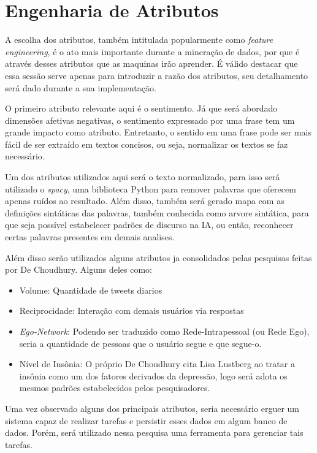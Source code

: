\section{Engenharia de Atributos}
A escolha dos atributos, também intitulada popularmente como \textit{feature engineering}, é o ato mais importante durante a mineração de dados, por que é através desses atributos que as maquinas irão aprender. É válido destacar que essa sessão serve apenas para introduzir a razão dos atributos, seu detalhamento será dado durante a sua implementação.

O primeiro atributo relevante aqui é o sentimento. Já que será abordado dimensões afetivas negativas, o sentimento expressado por uma frase tem um grande impacto como atributo. Entretanto, o sentido em uma frase pode ser mais fácil de ser extraído em textos concisos, ou seja, normalizar os textos se faz necessário.

Um dos atributos utilizados aqui será o texto normalizado, para isso será utilizado o \textit{spacy}, uma biblioteca Python para remover palavras que oferecem apenas ruídos ao resultado. Além disso, também será gerado mapa com as definições sintáticas das palavras, também conhecida como arvore sintática, para que seja possível estabelecer padrões de discurso na IA, ou então, reconhecer certas palavras presentes em demais analises.

Além disso serão utilizados alguns atributos ja consolidados pelas pesquisas feitas por De Choudhury\cite{de2013social, de2013predicting}. Alguns deles como:
\begin{itemize}
 \item Volume: Quantidade de tweets diarios
 \item Reciprocidade: Interação com demais usuários via respostas
 \item \textit{Ego-Network}: Podendo ser traduzido como Rede-Intrapessoal (ou Rede Ego), seria a quantidade de pessoas que o usuário segue e que segue-o.
 \item Nível de Insônia: O próprio De Choudhury cita Lisa Lustberg \cite{lustberg2000depression} ao tratar a insônia como um dos fatores derivados da depressão, logo será adota os mesmos padrões estabelecidos pelos pesquisadores.
\end{itemize}

Uma vez observado alguns dos principais atributos, seria necessário erguer um sistema capaz de realizar tarefas e persistir esses dados em algum banco de dados. Porém, será utilizado nessa pesquisa uma ferramenta para gerenciar tais tarefas.
